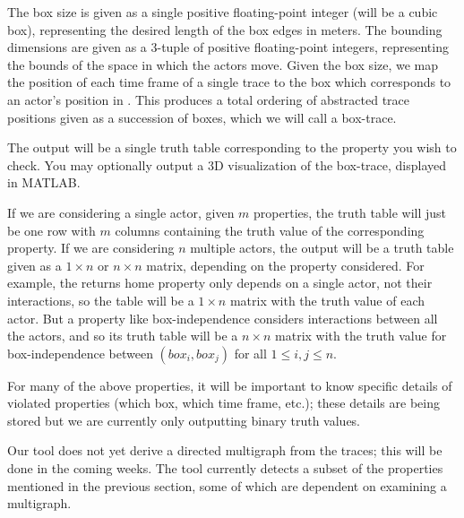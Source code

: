 The box size is given as a single positive floating-point integer (will be a cubic box), representing the desired length of the box edges in meters.
The bounding dimensions are given as a 3-tuple of positive floating-point integers, representing the bounds of the space in which the actors move.
Given the box size, we map the position of each time frame of a single trace to the box which corresponds to an actor's position in \rthree.
 This produces a total ordering of abstracted trace positions given as a succession of boxes, which we will call a box-trace.
 
 
 
 The output will be a single truth table corresponding to the property you wish to check.
 You may optionally output a 3D visualization of the box-trace, displayed in MATLAB.
 
 If we are considering a single actor, given $m$ properties, the truth table will just be one row with $m$ columns containing the truth value of the corresponding property.
 If we are considering $n$ multiple actors, the output will be a truth table given as a $1 \times n$ or $n \times n$ matrix, depending on the property considered.
 For example, the returns home property only depends on a single actor, not their interactions, so the table will be a $1 \times n$ matrix with the truth value of each actor.
 But a property like box-independence considers interactions between all the actors, and so its truth table will be a $n \times n$ matrix with the truth value for box-independence between $(box_i,box_j)$ for all $1 \leq i,j \leq n$.
 
  For many of the above properties, it will be important to know specific details of violated properties (which box, which time frame, etc.); these details are being stored but we are currently only outputting binary truth values.
  
  Our tool does not yet derive a directed multigraph from the traces; this will be done in the coming weeks.
  The tool currently detects a subset of the properties mentioned in the previous section, some of which are dependent on examining a multigraph.  